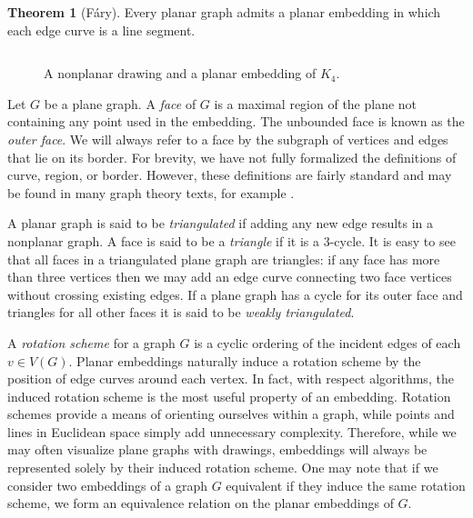 \documentclass[letterpaper, 12pt]{amsart}
\theoremstyle{definition}
\theoremstyle{definition}
\theoremstyle{thm}
\newtheorem{theorem}{Theorem}[section]
\theoremstyle{definition}
\begin{document}
\begin{theorem}[F\'ary]
Every planar graph admits a planar embedding in which each edge curve is a line
segment.
\end{theorem}

\begin{figure}
$\qquad$

\caption{A nonplanar drawing and a planar embedding of $K_4$.}
\end{figure}

Let $G$ be a plane graph. A \textit{face} of $G$ is a maximal region
of the plane not containing any point used in the embedding.
The unbounded face is known as the \textit{outer face}.
We will always refer to a face by the subgraph of
vertices and edges that lie on its border. For brevity, we have
not fully formalized the definitions of curve, region, or border. However, these
definitions are fairly standard and may be found in many graph theory texts, for
example \cite{west}.

A planar graph is said to be \textit{triangulated} if adding any new edge
results in a nonplanar graph. A face is said to be a \textit{triangle} if it is
a $3$-cycle. It is easy to see that all faces in a triangulated
plane graph are triangles: if any face has more than three vertices then we may
add an edge curve connecting two face vertices without crossing existing edges.
If a plane graph has a cycle for its outer face and triangles for all other
faces it is said to be \textit{weakly triangulated}.

A \textit{rotation scheme} for a graph $G$ is a cyclic ordering of the incident
edges of each $v\in V(G)$. Planar embeddings naturally induce a rotation
scheme by the position of edge curves around each vertex. In fact, with respect
algorithms, the induced rotation scheme is the
most useful property of an embedding. Rotation schemes provide a means of
orienting ourselves within a graph, while points and lines in Euclidean space
simply add unnecessary complexity. Therefore, while we may often visualize plane
graphs with drawings, embeddings will always be represented solely by their
induced rotation scheme. One may note that if we consider two embeddings of a
graph $G$ equivalent if they induce the same rotation scheme, we form an
equivalence relation on the planar embeddings of $G$.
\end{document}
